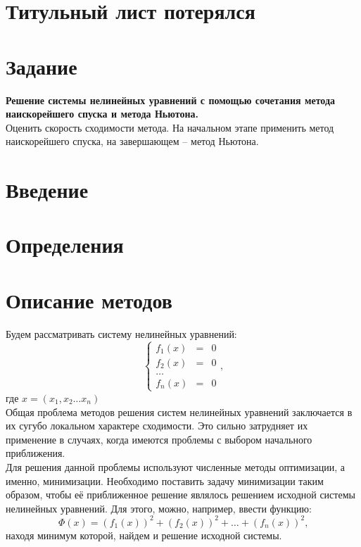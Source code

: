 \documentclass[a4paper, 12pt]{article}
\begin{document}
\section*{Титульный лист потерялся}
\newpage
\tableofcontents
\newpage
\section*{Задание}
\textbf{Решение системы нелинейных уравнений с помощью сочетания
метода наискорейшего спуска и метода Ньютона.}\\
Оценить скорость сходимости метода. На начальном этапе применить
метод наискорейшего спуска, на завершающем – метод Ньютона.
\newpage
\section*{Введение}
\newpage
\section*{Определения}
\newpage
\section*{Описание методов}
Будем рассматривать систему нелинейных уравнений:
\[
\left\{
\begin{array}{ccc}	f_1(x) & = &  0\\
	f_2(x) & = &  0\\
	\ldots \\
	f_n(x) & = &  0 
\end{array}
\text{,}
\right.
\]
где $x = (x_1, x_2 \ldots x_n)$\\
Общая проблема методов решения систем нелинейных уравнений заключается в их сугубо локальном
характере сходимости. Это сильно затрудняет их применение в случаях, когда имеются проблемы с 
выбором начального приближения.\\
Для решения данной проблемы используют численные методы оптимизации, а именно, минимизации.
Необходимо поставить задачу минимизации таким образом, чтобы её приближенное решение являлось решением 
исходной системы нелинейных уравнений. Для этого, можно, например, ввести функцию:
\begin{equation*}
	\Phi(x) = (f_1(x))^2 + (f_2(x))^2 + \ldots + (f_n(x))^2 \text{,}
\end{equation*}
находя минимум которой, найдем и решение исходной системы. 
\end{document}
